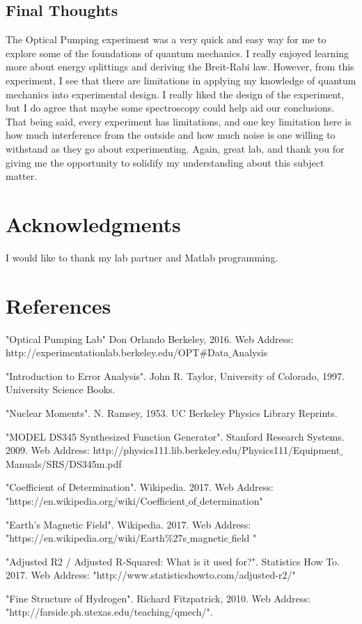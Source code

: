 \documentclass{article}
\begin{document}
    \subsection{Final Thoughts}
    The Optical Pumping experiment was a very quick and easy way for me to explore some of the foundations of quantum mechanics. I really enjoyed learning more about energy splittings and deriving the Breit-Rabi law. However, from this experiment, I see that there are limitations in applying my knowledge of quantum mechanics into experimental design. I really liked the design of the experiment, but I do agree that maybe some spectroscopy could help aid our conclusions. That being said, every experiment has limitations, and one key limitation here is how much interference from the outside and how much noise is one willing to withstand as they go about experimenting. Again, great lab, and thank you for giving me the opportunity to solidify my understanding about this subject matter.

\section{Acknowledgments}

I would like to thank my lab partner and Matlab programming.

\section{References}

\begin{thebibliography}{1} %

   "Optical Pumping Lab" Don Orlando Berkeley, 2016. Web Address: http://experimentationlab.berkeley.edu/OPT#Data$\_$Analysis 

    "Introduction to Error Analysis". John R. Taylor, University of Colorado, 1997. University Science Books.

   "Nuclear Moments". N. Ramsey, 1953. UC Berkeley Physics Library Reprints.
  
   "MODEL DS345 Synthesized Function Generator". Stanford Research Systems. 2009. Web Address: http://physics111.lib.berkeley.edu/Physics111/Equipment$\_$Manuals/SRS/DS345m.pdf
  
   "Coefficient of Determination". Wikipedia. 2017. Web Address: "https://en.wikipedia.org/wiki/Coefficient$\_$of$\_$determination"
  
   "Earth's Magnetic Field". Wikipedia. 2017. Web Address: "https://en.wikipedia.org/wiki/Earth$\%$27s$\_$magnetic$\_$field "

   "Adjusted R2 / Adjusted R-Squared: What is it used for?". Statistics How To. 2017. Web Address: "http://www.statisticshowto.com/adjusted-r2/"
  
   "Fine Structure of Hydrogen". Richard Fitzpatrick, 2010. Web Address: "http://farside.ph.utexas.edu/teaching/qmech/". 

  \end{thebibliography}
\end{document}
